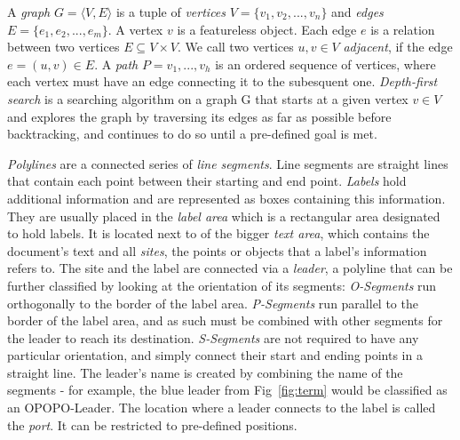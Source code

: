 \documentclass[11pt,a4paper]{vutinfth}
\begin{document}
A \emph{graph} $G=\langle V, E \rangle$ is a tuple of \emph{vertices} $V=\{v_1, v_2, ..., v_n\}$ and \emph{edges} $E=\{e_1, e_2, ..., e_m\}$. A vertex $v$ is a featureless object. %
 Each edge $e$ is a relation between two vertices $E \subseteq V\times V$. %
We call two vertices $u,v \in V$ \emph{adjacent}, if the edge $e=(u,v) \in E$.
 A \emph{path} $P=v_1, ..., v_h$ is an ordered sequence of vertices, where each vertex must have an edge connecting it to the subesquent one.
 \emph{Depth-first search} is a searching algorithm on a graph G that starts at a given vertex $v \in V$ and explores the graph by traversing its edges as far as possible before backtracking, and continues to do so until a pre-defined goal is met. %

\emph{Polylines} are a connected series of \emph{line segments}. Line segments are straight lines that contain each point between their starting and end point. 
\emph{Labels} hold additional information and are represented as boxes containing this information. They are usually placed in the \emph{label area} which is a rectangular area designated to hold labels. It is located next to of the bigger \emph{text area}, which contains the document's text and all \emph{sites}, the points or objects that a label's information refers to. The site and the label are connected via a \emph{leader}, a polyline that can be further classified by looking at the orientation of its segments: \emph{O-Segments} run orthogonally to the border of the label area. \emph{P-Segments} run parallel to the border of the label area, and as such must be combined with other segments for the leader to reach its destination. \emph{S-Segments} are not required to have any particular orientation, and simply connect their start and ending points in a straight line.
The leader's name is created by combining the name of the segments - for example, the blue leader from Fig~\ref{fig:term} would be classified as an OPOPO-Leader.
The location where a leader connects to the label is called the \emph{port}. It can be restricted to pre-defined positions. %
\end{document}
